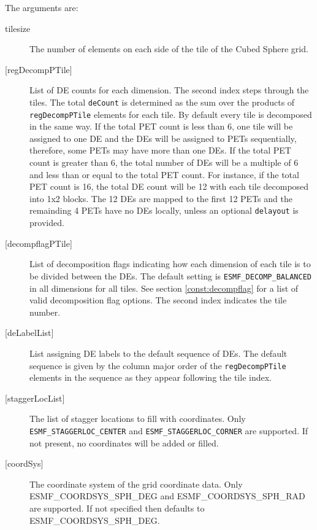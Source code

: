        The arguments are:
       \begin{description}
       \item[tilesize]
            The number of elements on each side of the tile of the Cubed Sphere grid.
       \item[{[regDecompPTile]}]
            List of DE counts for each dimension. The second index steps through
            the tiles. The total {\tt deCount} is determined as the sum over
            the products of {\tt regDecompPTile} elements for each tile.
            By default every tile is decomposed in the same way.  If the total
            PET count is less than 6, one tile will be assigned to one DE and the DEs
            will be assigned to PETs sequentially, therefore, some PETs may have
            more than one DEs.  If the total PET count is greater than 6, the total
            number of DEs will be a multiple of 6 and less than or equal to the total
            PET count.  For instance, if the total PET count is 16, the total DE count
            will be 12 with each tile decomposed into 1x2 blocks.  The 12 DEs are mapped
            to the first 12 PETs and the remainding 4 PETs have no DEs locally, unless
            an optional {\tt delayout} is provided.
       \item[{[decompflagPTile]}]
            List of decomposition flags indicating how each dimension of each
            tile is to be divided between the DEs. The default setting
            is {\tt ESMF\_DECOMP\_BALANCED} in all dimensions for all tiles.
            See section \ref{const:decompflag} for a list of valid decomposition
            flag options. The second index indicates the tile number.
       \item[{[deLabelList]}]
            List assigning DE labels to the default sequence of DEs. The default
            sequence is given by the column major order of the {\tt regDecompPTile}
            elements in the sequence as they appear following the tile index.
       \item[{[staggerLocList]}]
            The list of stagger locations to fill with coordinates. Only {\tt ESMF\_STAGGERLOC\_CENTER}
            and {\tt ESMF\_STAGGERLOC\_CORNER} are supported.  If not present, no coordinates
            will be added or filled.
       \item[{[coordSys]}]
            The coordinate system of the grid coordinate data.
            Only ESMF\_COORDSYS\_SPH\_DEG and ESMF\_COORDSYS\_SPH\_RAD are supported. 
            If not specified then defaults to ESMF\_COORDSYS\_SPH\_DEG.

\end{description}
